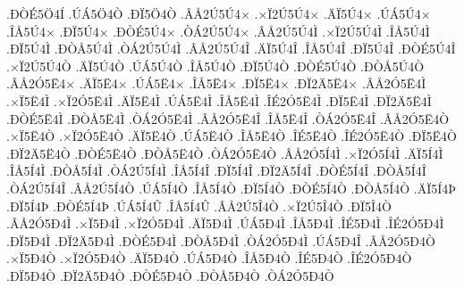 {.^^d0^^d2^^c95^^d64^^cd
.^^da^^c15^^d64^^d2
.^^d0^^cf5^^d64^^d2
.^^c2^^c52^^da5^^da4^^d7
.^^d7^^cf2^^da5^^da4^^d7
.^^c4^^cf5^^da4^^d7
.^^da^^c15^^da4^^d7
.^^ce^^c55^^da4^^d7
.^^d0^^cf5^^da4^^d7
.^^d0^^d2^^c95^^da4^^d7
.^^d2^^c12^^da5^^da4^^d7
.^^c2^^c52^^da5^^da4^^cc
.^^d7^^cf2^^da5^^da4^^cc
.^^ce^^c55^^da4^^cc
.^^d0^^cf5^^da4^^cc
.^^d0^^d2^^c55^^da4^^cc
.^^d2^^c12^^da5^^da4^^cc
.^^c2^^c52^^da5^^da4^^ce
.^^c4^^cf5^^da4^^ce
.^^ce^^c55^^da4^^ce
.^^d0^^cf5^^da4^^ce
.^^d0^^d2^^c95^^da4^^ce
.^^d7^^cf2^^da5^^da4^^d2
.^^c4^^cf5^^da4^^d2
.^^da^^c15^^da4^^d2
.^^ce^^c55^^da4^^d2
.^^d0^^cf5^^da4^^d2
.^^d0^^d2^^c95^^da4^^d2
.^^d0^^d2^^c55^^da4^^d2
.^^c2^^c52^^d35^^cb4^^d7
.^^c4^^cf5^^cb4^^d7
.^^da^^c15^^cb4^^d7
.^^ce^^c55^^cb4^^d7
.^^d0^^cf5^^cb4^^d7
.^^d0^^cf2^^c45^^cb4^^d7
.^^c2^^c52^^d35^^cb4^^cc
.^^d7^^cf5^^cb4^^cc
.^^d7^^cf2^^d35^^cb4^^cc
.^^c4^^cf5^^cb4^^cc
.^^da^^c15^^cb4^^cc
.^^ce^^c55^^cb4^^cc
.^^ce^^c92^^d35^^cb4^^cc
.^^d0^^cf5^^cb4^^cc
.^^d0^^cf2^^c45^^cb4^^cc
.^^d0^^d2^^c95^^cb4^^cc
.^^d0^^d2^^c55^^cb4^^cc
.^^d2^^c12^^d35^^cb4^^cc
.^^c2^^c52^^d35^^cb4^^ce
.^^ce^^c55^^cb4^^ce
.^^d2^^c12^^d35^^cb4^^ce
.^^c2^^c52^^d35^^cb4^^d2
.^^d7^^cf5^^cb4^^d2
.^^d7^^cf2^^d35^^cb4^^d2
.^^c4^^cf5^^cb4^^d2
.^^da^^c15^^cb4^^d2
.^^ce^^c55^^cb4^^d2
.^^ce^^c95^^cb4^^d2
.^^ce^^c92^^d35^^cb4^^d2
.^^d0^^cf5^^cb4^^d2
.^^d0^^cf2^^c45^^cb4^^d2
.^^d0^^d2^^c95^^cb4^^d2
.^^d0^^d2^^c55^^cb4^^d2
.^^d2^^c12^^d35^^cb4^^d2
.^^c2^^c52^^d35^^cd4^^cc
.^^d7^^cf2^^d35^^cd4^^cc
.^^c4^^cf5^^cd4^^cc
.^^ce^^c55^^cd4^^cc
.^^d0^^d2^^c55^^cd4^^cc
.^^d2^^c12^^da5^^cd4^^cc
.^^ce^^c55^^cd4^^ce
.^^d0^^cf5^^cd4^^ce
.^^d0^^cf2^^c45^^cd4^^ce
.^^d0^^d2^^c95^^cd4^^ce
.^^d0^^d2^^c55^^cd4^^ce
.^^d2^^c12^^da5^^cd4^^ce
.^^c2^^c52^^da5^^cd4^^d2
.^^da^^c15^^cd4^^d2
.^^ce^^c55^^cd4^^d2
.^^d0^^cf5^^cd4^^d2
.^^d0^^d2^^c95^^cd4^^d2
.^^d0^^d2^^c55^^cd4^^d2
.^^c4^^cf5^^cd4^^de
.^^d0^^cf5^^cd4^^de
.^^d0^^d2^^c95^^cd4^^de
.^^da^^c15^^cd4^^db
.^^ce^^c55^^cd4^^db
.^^c2^^c52^^da5^^ce4^^d2
.^^d7^^cf2^^da5^^ce4^^d2
.^^d0^^cf5^^ce4^^d2
.^^c2^^c52^^d35^^d04^^cc
.^^d7^^cf5^^d04^^cc
.^^d7^^cf2^^d35^^d04^^cc
.^^c4^^cf5^^d04^^cc
.^^da^^c15^^d04^^cc
.^^ce^^c55^^d04^^cc
.^^ce^^c95^^d04^^cc
.^^ce^^c92^^d35^^d04^^cc
.^^d0^^cf5^^d04^^cc
.^^d0^^cf2^^c45^^d04^^cc
.^^d0^^d2^^c95^^d04^^cc
.^^d0^^d2^^c55^^d04^^cc
.^^d2^^c12^^d35^^d04^^cc
.^^da^^c15^^d04^^ce
.^^c2^^c52^^d35^^d04^^d2
.^^d7^^cf5^^d04^^d2
.^^d7^^cf2^^d35^^d04^^d2
.^^c4^^cf5^^d04^^d2
.^^da^^c15^^d04^^d2
.^^ce^^c55^^d04^^d2
.^^ce^^c95^^d04^^d2
.^^ce^^c92^^d35^^d04^^d2
.^^d0^^cf5^^d04^^d2
.^^d0^^cf2^^c45^^d04^^d2
.^^d0^^d2^^c95^^d04^^d2
.^^d0^^d2^^c55^^d04^^d2
.^^d2^^c12^^d35^^d04^^d2
}
